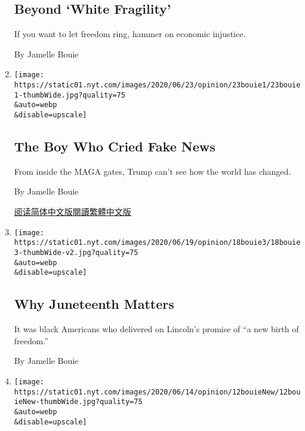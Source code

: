 \begin{enumerate}
{  \subsection{Beyond `White Fragility'}\label{beyond-white-fragility}}

  If you want to let freedom ring, hammer on economic injustice.

  By Jamelle Bouie
\item
  \href{/2020/06/23/opinion/maga-trump-fake-news.html}{}

  \texttt{[image: https://static01.nyt.com/images/2020/06/23/opinion/23bouie1/23bouie1-thumbWide.jpg?quality=75\\\&auto=webp\\\&disable=upscale]}

  \hypertarget{the-boy-who-cried-fake-news}{%
  \subsection{The Boy Who Cried Fake
  News}\label{the-boy-who-cried-fake-news}}

  From inside the MAGA gates, Trump can't see how the world has changed.

  By Jamelle Bouie

  \href{https://cn.nytimes.com/opinion/20200624/maga-trump-fake-news/}{阅读简体中文版}\href{https://cn.nytimes.com/opinion/20200624/maga-trump-fake-news/zh-hant/}{閱讀繁體中文版}
\item
  \href{/2020/06/18/opinion/juneteenth-slavery-freedom.html}{}

  \texttt{[image: https://static01.nyt.com/images/2020/06/19/opinion/18bouie3/18bouie3-thumbWide-v2.jpg?quality=75\\\&auto=webp\\\&disable=upscale]}

  \hypertarget{why-juneteenth-matters}{%
  \subsection{Why Juneteenth Matters}\label{why-juneteenth-matters}}

  It was black Americans who delivered on Lincoln's promise of ``a new
  birth of freedom.''

  By Jamelle Bouie
\item
  \href{/2020/06/12/opinion/sunday/floyd-protests-white-supremacy.html}{}

  \texttt{[image: https://static01.nyt.com/images/2020/06/14/opinion/12bouieNew/12bouieNew-thumbWide.jpg?quality=75\\\&auto=webp\\\&disable=upscale]}

  \hypertarget{to-overturn-trump-we-need-to-overturn-white-supremacy}{%
}
\end{enumerate}
